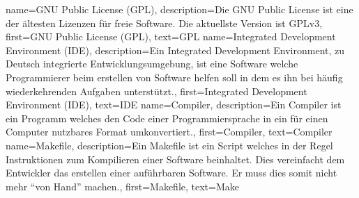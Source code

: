 {
    name={GNU Public License (GPL)},
    description={Die GNU Public License ist eine der ältesten Lizenzen für
      freie Software. Die aktuellste Version ist GPLv3},
    first={GNU Public License (GPL)},
    text={GPL}
}
{
    name={Integrated Development Environment (IDE)},
    description={Ein Integrated Development Environment, zu Deutsch integrierte
        Entwicklungsumgebung, ist eine Software welche Programmierer beim
        erstellen von Software helfen soll in dem es ihn bei häufig
        wiederkehrenden Aufgaben unterstützt.},
    first={Integrated Development Environment (IDE)},
    text={IDE}
}
{
    name={Compiler},
    description={Ein Compiler ist ein Programm welches den Code einer
      Programmiersprache in ein für einen Computer nutzbares Format
      umkonvertiert.},
    first={Compiler},
    text={Compiler}
}
{
    name={Makefile},
    description={Ein Makefile ist ein Script welches in der Regel Instruktionen
    zum Kompilieren einer Software beinhaltet. Dies vereinfacht dem Entwickler
    das erstellen einer auführbaren Software. Er muss dies somit nicht mehr
    ``von Hand'' machen.},
    first={Makefile},
    text={Make}
}